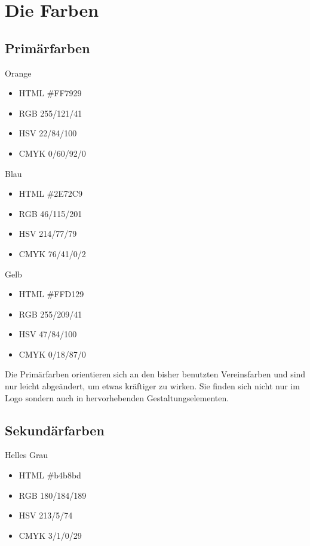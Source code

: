 \documentclass{article}
\begin{document}


\cleardoublepage
\section{Die Farben}

\subsection{Primärfarben}
\begin{samepage}
\cfield[LESOrange]
Orange
\begin{itemize}
\item HTML \#FF7929
\item RGB 255/121/41
\item HSV 22/84/100
\item CMYK 0/60/92/0
\end{itemize}
\end{samepage}

\begin{samepage}
\cfield[LESBlue]
Blau
\begin{itemize}
\item HTML \#2E72C9
\item RGB 46/115/201
\item HSV 214/77/79
\item CMYK 76/41/0/2
\end{itemize}
\end{samepage}

\begin{samepage}
\cfield[LESYellow]
Gelb
\begin{itemize}
\item HTML \#FFD129
\item RGB 255/209/41
\item HSV 47/84/100
\item CMYK 0/18/87/0
\end{itemize}
\end{samepage}

Die Primärfarben orientieren sich an den bisher benutzten Vereinsfarben und sind nur leicht abgeändert, um etwas kräftiger zu wirken.
Sie finden sich nicht nur im Logo sondern auch in hervorhebenden Gestaltungselementen.

\subsection{Sekundärfarben}
\begin{samepage}
\cfield[SECLight]
Helles Grau
\begin{itemize}
\item HTML \#b4b8bd
\item RGB 180/184/189
\item HSV 213/5/74
\item CMYK 3/1/0/29
\end{itemize}
\end{samepage}
\end{document}

